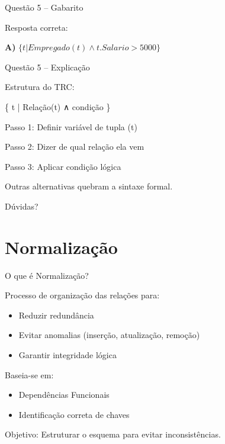 \documentclass{beamer}
\begin{document}
\begin{frame}{Questão 5 – Gabarito}

Resposta correta:

\Large \textbf{A)} $\{ t | Empregado(t) \land t.Salario > 5000 \}$

\end{frame}





\begin{frame}{Questão 5 – Explicação}

Estrutura do TRC:

\{ t | Relação(t) ∧ condição \}

Passo 1:
Definir variável de tupla (t)

Passo 2:
Dizer de qual relação ela vem

Passo 3:
Aplicar condição lógica

Outras alternativas quebram a sintaxe formal.

\end{frame}





\begin{frame}
\centering
\Huge Dúvidas?
\end{frame}




\section{Normalização}

\begin{frame}{O que é Normalização?}

Processo de organização das relações para:

\begin{itemize}
    \item Reduzir redundância
    \item Evitar anomalias (inserção, atualização, remoção)
    \item Garantir integridade lógica
\end{itemize}

Baseia-se em:
\begin{itemize}
    \item Dependências Funcionais
    \item Identificação correta de chaves
\end{itemize}

Objetivo:
Estruturar o esquema para evitar inconsistências.

\end{frame}
\end{document}
